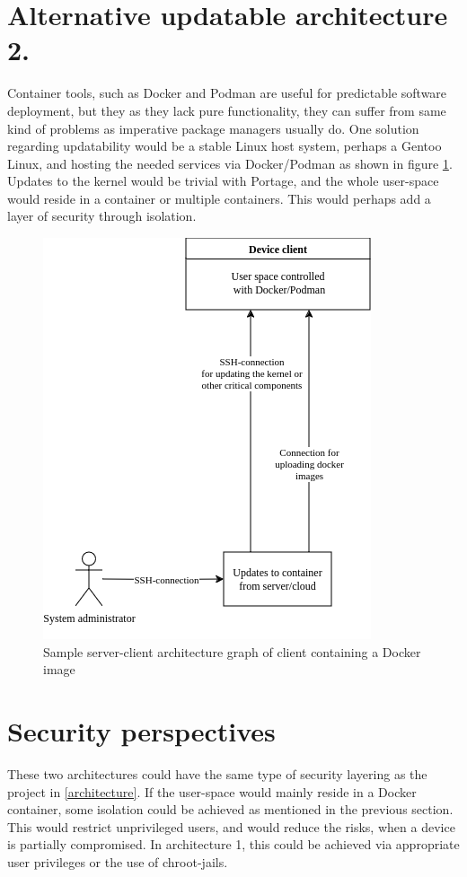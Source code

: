 \section{Alternative updatable architecture 2.}
Container tools, such as Docker and Podman are useful for predictable
software deployment, but they as they lack pure functionality, they
can suffer from same kind of problems as imperative package managers
usually do. One solution regarding updatability would be a stable
Linux host system, perhaps a Gentoo Linux, and hosting the needed
services via Docker/Podman as shown in figure
\ref{dockerarchitecture}. Updates to the kernel would be trivial with
Portage, and the whole user-space would reside in a container or
multiple containers. This would perhaps add a layer of security
through isolation.
\begin{figure}[H]
\centering
\includegraphics[scale=0.7]{latex/kuvat/dockerarchitecture.drawio.png}
\caption{Sample server-client architecture graph of client containing
  a Docker image}
\label{dockerarchitecture}
\end{figure}

\section{Security perspectives}
These two architectures could have the same type of security layering
as the project in \ref{architecture}. If the user-space would mainly
reside in a Docker container, some isolation could be achieved as
mentioned in the previous section. This would restrict unprivileged
users, and would reduce the risks, when a device is partially
compromised. In architecture 1, this could be achieved via appropriate
user privileges or the use of chroot-jails.
